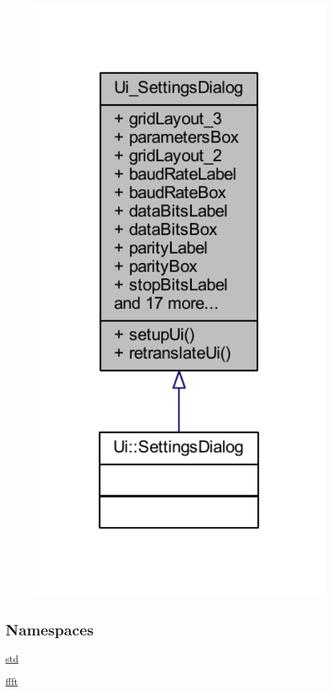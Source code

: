 \begin{figure}[H]
\begin{center}
\leavevmode
\includegraphics[width=350pt]{dd/de2/a00320}
\end{center}
\end{figure}
\subsection*{Namespaces}
\begin{DoxyCompactItemize}
\item 
 \hyperlink{a00144}{std}
\item 
 \hyperlink{a00142}{ffft}
\end{DoxyCompactItemize}
